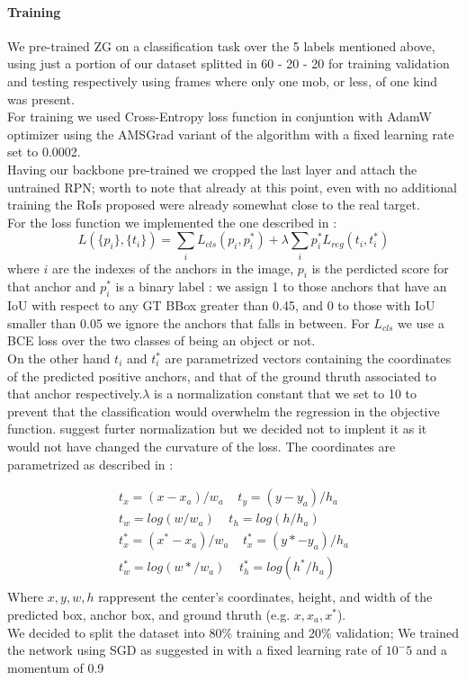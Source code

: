 \documentclass[10pt,journal,cspaper,compsoc]{IEEEtran}
\begin{document}
    \paragraph{Training}
	    We pre-trained ZG on a classification task over the 5 labels mentioned above,  using just a portion of our dataset splitted in 60 - 20 - 20 for training validation and testing respectively using frames where only one mob, or less,  of one kind was present.\\ For training we used Cross-Entropy loss function in conjuntion with AdamW optimizer using the AMSGrad variant of the algorithm            	    with a fixed learning rate set to 0.0002.\\
	Having our backbone pre-trained we cropped the last layer and attach the untrained RPN; worth to note that already at this point, even with no additional training the RoIs proposed were already somewhat close to the real target.\\ For the loss function we implemented the one described in \cite{arxiv:FasterRCNN}:
	$$
	L(\{p_i\}, \{t_i\}) = \sum_i  L_{cls}(p_i, p_i^*) +\lambda \sum_i p_i^* L_{reg}(t_i, t_i^*)
	$$
	where $i$ are the indexes of the anchors in the image, $p_i$ is the perdicted score for that anchor and $p_i^*$ is a binary label : we assign 1 to those anchors that have an IoU with respect to any GT BBox greater than 0.45, and 0 to those with IoU smaller than 0.05 we ignore the anchors that falls in between. For $L_{cls}$  we use a BCE loss over the two classes of being an object or not. \\On the other hand $t_i$ and $t_i^*$ are parametrized vectors containing the coordinates of the predicted positive anchors, and that of the ground thruth associated to that anchor respectively.$\lambda$ is a normalization constant that we set to 10 to prevent that the classification would overwhelm the regression in the objective function. \cite{arxiv:FastRCNN} suggest furter normalization but we decided not to implent it as it would not have changed the curvature of the loss. The coordinates are parametrized as described in \cite{arxiv:FasterRCNN} : 

\begin{equation}
\begin{aligned}
t_x = (x - x_a)/w_a \; \;\;\;  t_y =(y - y_a)/h_a \\
t_w = log(w/w_a) \;\;\;\; t_h = log (h/h_a) \\
t_x^* = (x^* - x_a)/w_a \;\;\;\; t_x^* = (y* - y_a)/h_a \\
t_w^* = log(w*/w_a) \;\;\;\;  t_h^*  = log(h^*/h_a) \\
\end{aligned}
\end{equation}
Where $x,y,w,h$ rappresent the center's coordinates, height, and width of the predicted box, anchor box, and ground thruth (e.g. $x, x_a, x^*$).\\ We decided to split the dataset into 80\% training and 20\% validation; We trained the network using SGD as suggested in \cite{arxiv:FasterRCNN} with a fixed learning rate of $10^-5$ and a momentum of 0.9
    
\end{document}
